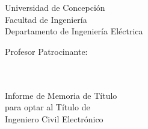 \begin{titlepage}
\begingroup

\linespread{1}\selectfont
\setlength{\parskip}{0pt}

\begin{minipage}{0.45\textwidth}
	Universidad de Concepción \\ Facultad de Ingeniería \\ Departamento de Ingeniería Eléctrica
\end{minipage}
%
\hfill
%
\begin{minipage}{0.45\textwidth}
	\raggedleft
	Profesor Patrocinante: \\ \AdvisorNameA 
\end{minipage}
%
%
\begin{center} 
	\vspace{5cm}
	
	\textsc{\huge \MainTitle}\\[5.5cm]

	{\large \AuthorName}\\[1.5cm]

	Informe de Memoria de Título\\
	para optar al Título de\\[1.5cm] 

	Ingeniero Civil Electrónico

	\vfill

	\ifdefined\MyCustomDate
		{\large \MyCustomDate}
	\else
		{\large {\monthname} \the\year}
	\fi
\end{center}

\endgroup
\end{titlepage}
